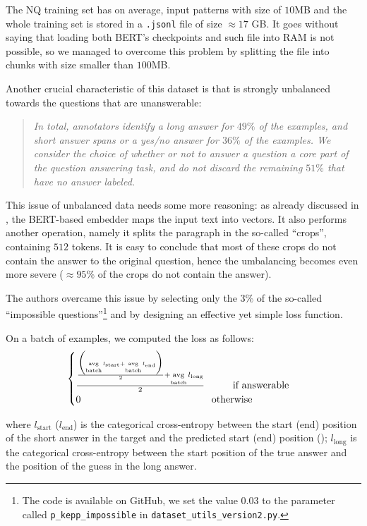 \documentclass[10pt,hidelinks]{article}
\DeclareMathOperator*{\avg}{avg}
\begin{document}
The NQ training set has on average, input patterns with size of $10$MB and the whole training set is stored in a \texttt{.jsonl} file of size $\approx 17$ GB.
It goes without saying that loading both BERT's checkpoints and such file into RAM is not possible, so we managed to overcome this problem by splitting the file into chunks with size smaller than $100$MB.

Another crucial characteristic of this dataset is that is strongly unbalanced towards the questions that are unanswerable:
\blockquote{\it In total, annotators identify a long answer for $49\%$ of the examples, and short answer spans or a yes/no answer for $36\%$ of the examples. We consider the choice of whether or not to answer a question a core part of the question answering task, and do not discard the remaining $51\%$ that have no answer labeled.\cite{kwiatowski}}
	
This issue of unbalanced data needs some more reasoning: as already discussed in , the BERT-based embedder maps the input text into vectors. It also performs another operation, namely it splits the paragraph in the so-called ``crops'', containing $512$ tokens.
It is easy to conclude that most of these crops do not contain the answer to the original question, hence the umbalancing becomes even more severe ($\approx 95\%$ of the crops do not contain the answer).

The authors overcame this issue by selecting only the $3\%$ of the so-called ``impossible questions''\footnote{The code is available on GitHub, we set the value $0.03$ to the parameter called \texttt{p\_kepp\_impossible} in \texttt{dataset\_utils\_version2.py}.} and by designing an effective yet simple loss function.

On a batch of examples, we computed the loss as follows:
\[
\begin{cases}
\frac{\frac{\biggl ( \avg\limits_{\text{batch}} l_\text{start} + \avg\limits_{\text{batch}} l_\text{end}  \biggr )}{2} + \avg\limits_{\text{batch}} l_\text{long}}{2} \hspace{1cm}\text{if answerable}\\
0 \hspace{4.65cm} \text{otherwise}
\end{cases}
\]
 
 where $l_{\text{start}}$ ($l_{\text{end}}$)  is the categorical cross-entropy between the start (end) position of the short answer in the target and the predicted start (end) position (); $l_{\text{long}}$ is the categorical cross-entropy between the start position of the true answer and the position of the guess in the long answer.
\end{document}
